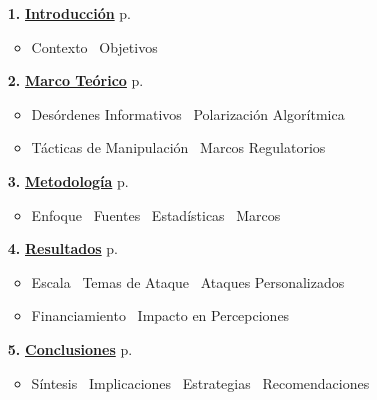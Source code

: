 \begin{itemize}
    \itemsep=0.18cm
    
    \item[\textbf{1.}] \hyperlink{sec1}{\textbf{Introducción}} \dotfill p. \pageref{sec1}
    \begin{itemize}
        \itemsep=0.06cm
        \footnotesize
        \item Contexto \textbullet\ Objetivos
    \end{itemize}
    
    \item[\textbf{2.}] \hyperlink{sec2}{\textbf{Marco Teórico}} \dotfill p. \pageref{sec2}
    \begin{itemize}
        \itemsep=0.06cm
        \footnotesize
        \item Desórdenes Informativos \textbullet\ Polarización Algorítmica
        \item Tácticas de Manipulación \textbullet\ Marcos Regulatorios
    \end{itemize}
    
    \item[\textbf{3.}] \hyperlink{sec3}{\textbf{Metodología}} \dotfill p. \pageref{sec3}
    \begin{itemize}
        \itemsep=0.06cm
        \footnotesize
        \item Enfoque \textbullet\ Fuentes \textbullet\ Estadísticas \textbullet\ Marcos
    \end{itemize}
    
    \item[\textbf{4.}] \hyperlink{sec4}{\textbf{Resultados}} \dotfill p. \pageref{sec4}
    \begin{itemize}
        \itemsep=0.06cm
        \footnotesize
        \item Escala \textbullet\ Temas de Ataque \textbullet\ Ataques Personalizados
        \item Financiamiento \textbullet\ Impacto en Percepciones
    \end{itemize}
    
    \item[\textbf{5.}] \hyperlink{sec5}{\textbf{Conclusiones}} \dotfill p. \pageref{sec5}
    \begin{itemize}
        \itemsep=0.06cm
        \footnotesize
        \item Síntesis \textbullet\ Implicaciones \textbullet\ Estrategias \textbullet\ Recomendaciones
    \end{itemize}
    
\end{itemize}


